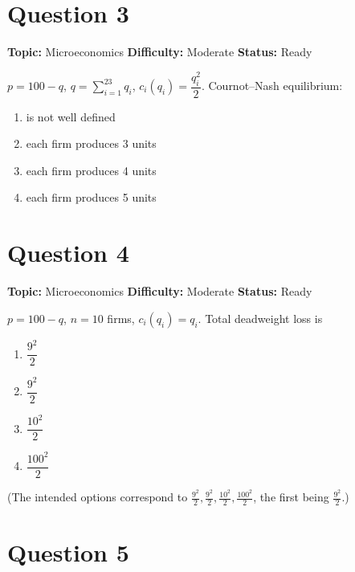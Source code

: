 \documentclass[11pt]{article}
\begin{document}
\newpage

\section*{Question 3}


\noindent\textbf{Topic:} Microeconomics \quad \textbf{Difficulty:} Moderate \quad \textbf{Status:} Ready



$p=100-q$, $q=\sum_{i=1}^{23}q_i$, $c_i(q_i)=\dfrac{q_i^{2}}{2}$. Cournot--Nash equilibrium:
\begin{enumerate}[label=(\Alph*)]
\item is not well defined
\item each firm produces 3 units
\item each firm produces 4 units
\item each firm produces 5 units
\end{enumerate}

\newpage

\section*{Question 4}


\noindent\textbf{Topic:} Microeconomics \quad \textbf{Difficulty:} Moderate \quad \textbf{Status:} Ready



$p=100-q$, $n=10$ firms, $c_i(q_i)=q_i$. Total deadweight loss is
\begin{enumerate}[label=(\Alph*)]
\item $\dfrac{9^2}{2}$ \qquad
\item $\dfrac{9^2}{2}$ \qquad
\item $\dfrac{10^2}{2}$ \qquad
\item $\dfrac{100^2}{2}$
\end{enumerate}
(The intended options correspond to $\frac{9^2}{2},\frac{9^2}{2},\frac{10^2}{2},\frac{100^2}{2}$, the first being $\frac{9^2}{2}$.)

\newpage

\section*{Question 5}

\end{document}
